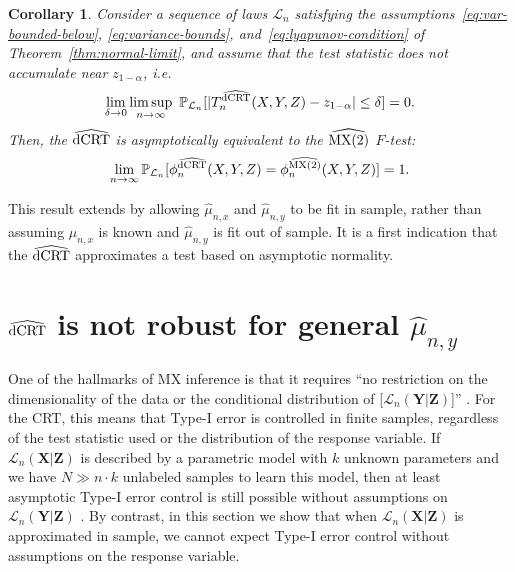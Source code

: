 \documentclass[aos]{imsart}
\theoremstyle{plain}
\newtheorem{corollary}{Corollary}
\theoremstyle{remark}
\renewcommand{\P}{\mathbb{P}}							%
\newcommand{\prx}{\bm X}								%
\newcommand{\srx}{X}									%
\newcommand{\prz}{\bm Z}								%
\newcommand{\srz}{Z}									%
\newcommand{\pry}{{\bm Y}}								%
\newcommand{\sry}{Y}									%
\newcommand{\law}{\mathcal L}							%
\newcommand{\dCRThat}{\widehat{\textnormal{dCRT}}}		%
\newcommand{\MXtwohat}{\widehat{\textnormal{MX(2)}}}	%
\begin{document}
\begin{corollary} \label{cor:asymptotic-equivalence} 
    Consider a sequence of laws $\law_n$ satisfying the assumptions~\eqref{eq:var-bounded-below}, \eqref{eq:variance-bounds}, and~\eqref{eq:lyapunov-condition} of Theorem~\ref{thm:normal-limit}, and assume that the test statistic does not accumulate near $z_{1-\alpha}$, i.e.
    \begin{equation}
        \lim_{\delta \rightarrow 0}\limsup_{n \rightarrow \infty}\ \P_{\law_n}[|T_n^{\dCRThat}(\srx, \sry, \srz)-z_{1-\alpha}| \leq \delta] = 0.
        \label{eq:non-accumulation}
    \end{equation}
    Then, the $\dCRThat$ is asymptotically equivalent to the $\MXtwohat$ $F$-test:
    \begin{equation}
        \lim_{n \rightarrow \infty}\P_{\law_n}[\phi_n^{\dCRThat}(\srx, \sry, \srz) = \phi_n^{\MXtwohat}(\srx, \sry, \srz)] = 1.
    \end{equation}
    
\end{corollary}

This result extends \citet[Theorem 2]{Katsevich2020a} by allowing $\widehat \mu_{n,x}$ and $\widehat \mu_{n,y}$ to be fit in sample, rather than assuming $\mu_{n,x}$ is known and $\widehat \mu_{n,y}$ is fit out of sample. It is a first indication that the $\dCRThat$ approximates a test based on asymptotic normality.

\section{$\dCRThat$ is not robust for general $\widehat \mu_{n,y}$} \label{sec:neg-results}
	
One of the hallmarks of MX inference is that it requires ``no restriction on the dimensionality of the data or the conditional distribution of [$\law_n(\pry|\prz)$]'' \citep{CetL16}. For the CRT, this means that Type-I error is controlled in finite samples, regardless of the test statistic used or the distribution of the response variable. If $\law_n(\prx|\prz)$ is described by a parametric model with $k$ unknown parameters and we have $N \gg n \cdot k$ unlabeled samples to learn this model, then at least asymptotic Type-I error control is still possible without assumptions on $\law_n(\pry|\prz)$ \citep{Berrett2019}. By contrast, in this section we show that when $\law_n(\prx|\prz)$ is approximated in sample, we cannot expect Type-I error control without assumptions on the response variable.
\end{document}

